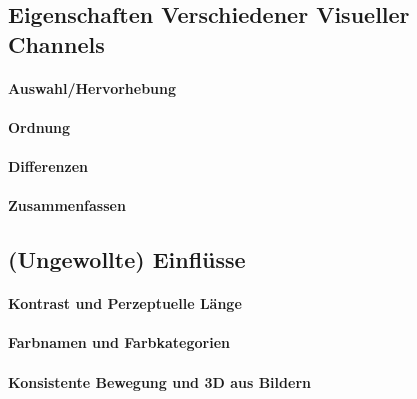         \subsection{Eigenschaften Verschiedener Visueller Channels} %

                \paragraph{Auswahl/Hervorhebung} %

                \paragraph{Ordnung} %

                \paragraph{Differenzen} %

                \paragraph{Zusammenfassen} %

        \subsection{(Ungewollte) Einflüsse} %

                \paragraph{Kontrast und Perzeptuelle Länge} %

                \paragraph{Farbnamen und Farbkategorien} %

                \paragraph{Konsistente Bewegung und 3D aus Bildern} %

